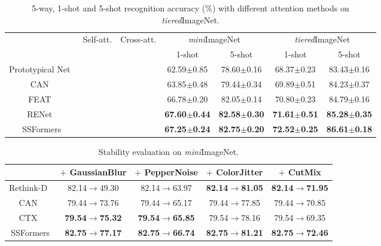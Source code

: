 \documentclass{SCIS2019}
\begin{document}
	\begin{table}[t]
		\centering
		\caption{5-way, 1-shot and 5-shot recognition accuracy (\%) with different attention methods on \emph{tiered}ImageNet.}
		\begin{tabular*}{\hsize}{@{}@{\extracolsep{\fill}}ccccccc@{}}
			\toprule
			\label{parameter}
			\multirow{2}{*}{Method} &\multirow{2}{*}{Self-att.} 
			&\multirow{2}{*}{Cross-att.}&\multicolumn{2}{c}{\emph{mini}ImageNet} &\multicolumn{2}{c}{\emph{tiered}ImageNet} \\
			&&&1-shot&5-shot&1-shot&5-shot\\
			\midrule	
			Prototypical Net~\cite{7}&&& 62.59$\pm$\footnotesize{0.85} & 78.60$\pm$\footnotesize{0.16}& 68.37$\pm$\footnotesize{0.23} & 83.43$\pm$\footnotesize{0.16}\\
			CAN~\cite{14}&&\CheckmarkBold&  63.85$\pm$\footnotesize{0.48}& 79.44$\pm$\footnotesize{0.34} & 69.89$\pm$\footnotesize{0.51}& 84.23$\pm$\footnotesize{0.37} \\
			FEAT~\cite{19}&&\CheckmarkBold&  66.78$\pm$\footnotesize{0.20}& 82.05$\pm$\footnotesize{0.14}& 70.80$\pm$\footnotesize{0.23}& 84.79$\pm$\footnotesize{0.16}\\
			RENet~\cite{10}&\CheckmarkBold&\CheckmarkBold& \textbf{67.60$\pm$\footnotesize{0.44}} & \textbf{82.58$\pm$\footnotesize{0.30}} & \textbf{71.61$\pm$\footnotesize{0.51}}& \textbf{85.28$\pm$\footnotesize{0.35}}\\	
			SSFormers&&\CheckmarkBold &\textbf{67.25$\pm$\footnotesize{0.24}}  & \textbf{82.75$\pm$\footnotesize{0.20}}  &\textbf{72.52$\pm$\footnotesize{0.25}}  & \textbf{86.61$\pm$\footnotesize{0.18}}\\
			\bottomrule
		\end{tabular*}
	\end{table}
	
	\begin{table}[t]
		\centering
		\caption{Stability evaluation on \emph{mini}ImageNet.}
		\begin{tabular*}{\hsize}{@{}@{\extracolsep{\fill}}ccccc@{}}
			\toprule
			\label{stable}    
			&$+$ GaussianBlur &$+$ PepperNoise &$+$ ColorJitter & $+$ CutMix \\
			\midrule	
			Rethink-D~\cite{40} &82.14$\rightarrow$49.30 &82.14$\rightarrow$63.97 &\textbf{82.14$\rightarrow$81.05}&\textbf{82.14$\rightarrow$71.95}\\ 
			CAN~\cite{14} &79.44$\rightarrow$73.76 &79.44$\rightarrow$65.17 & 79.44$\rightarrow$77.85 &79.44$\rightarrow$70.85\\ 
			CTX~\cite{21} &\textbf{79.54$\rightarrow$75.32}  &\textbf{79.54$\rightarrow$65.85} & 79.54$\rightarrow$78.16 &79.54$\rightarrow$69.35\\ 
			SSFormers &\textbf{82.75$\rightarrow$77.17}&\textbf{82.75$\rightarrow$66.74} &\textbf{82.75$\rightarrow$81.21}&\textbf{82.75$\rightarrow$72.46} \\	 				
			\bottomrule				
			\bottomrule
		\end{tabular*}
	\end{table}
	
\end{document}
